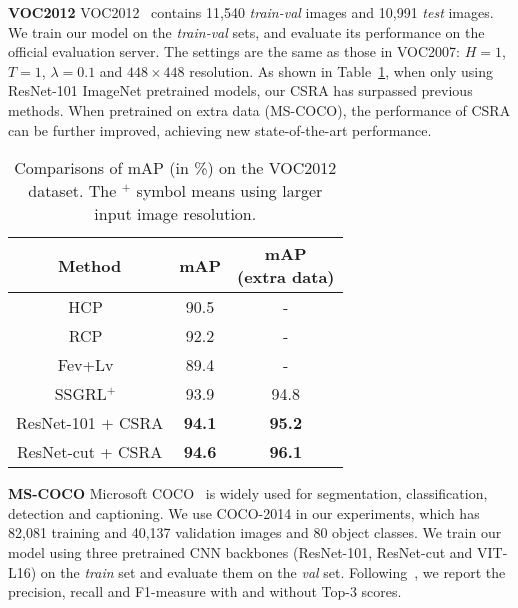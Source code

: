 \documentclass[10pt,twocolumn,letterpaper]{article}
\begin{document}
\vspace{6pt}\noindent\textbf{VOC2012} VOC2012~\cite{VOC2012} contains 11,540 \emph{train-val} images and 10,991 \emph{test} images. We train our model on the \emph{train-val} sets, and evaluate its performance on the official evaluation server. The settings are the same as those in VOC2007: $H=1$, $T=1$, $\lambda=0.1$ and $448 \times 448$ resolution. As shown in Table~\ref{tab:voc2012}, when only using ResNet-101 ImageNet pretrained models, our CSRA has surpassed previous methods. When pretrained on extra data (MS-COCO), the performance of CSRA can be further improved, achieving new state-of-the-art performance.

\begin{table}
	\caption{Comparisons of mAP (in \%) on the VOC2012 dataset. The $^+$ symbol means using larger input image resolution.}
	\label{tab:voc2012}
	\centering
	\small
	\begin{tabular}{c|c|c}
		\hline
		Method                                  & mAP           & \thead{mAP\\(extra data)} \\
		\hline\hline
		HCP~\cite{2015_PAMI_HCP}                & 90.5          & -                              \\
		RCP~\cite{2016_ICIP_RCP}                & 92.2          & -                              \\
		Fev+Lv~\cite{Fev_Lv}                    & 89.4          & -                              \\
		SSGRL$^+$~\cite{2019_ICCV_GCNre}        & 93.9          & 94.8                           \\
		\hline
		ResNet-101 + CSRA                       & \textbf{94.1} & \textbf{95.2}                  \\
		ResNet-cut + CSRA                       & \textbf{94.6} & \textbf{96.1}                  \\
		\hline
	\end{tabular}
\end{table}

\vspace{6pt}\noindent\textbf{MS-COCO} Microsoft COCO~\cite{MSCOCO} is widely used for segmentation, classification, detection and captioning. We use COCO-2014 in our experiments, which has 82,081 training and 40,137 validation images and 80 object classes. We train our model using three pretrained CNN backbones (ResNet-101, ResNet-cut and VIT-L16) on the \emph{train} set and evaluate them on the \emph{val} set. Following~\cite{2019_ICCV_GCNre,2019_CVPR_VA}, we report the precision, recall and F1-measure with and without Top-3 scores.
\end{document}
